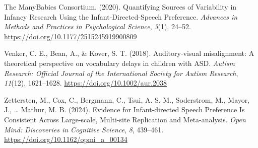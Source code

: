 \documentclass[
  english,
  man,floatsintext]{apa6}
\newlength{\cslhangindent}
\newenvironment{CSLReferences}[2] %
 {\begin{list}{}{%
  \setlength{\itemindent}{0pt}
  \setlength{\leftmargin}{0pt}
  \setlength{\parsep}{0pt}
  \ifodd #1
   \setlength{\leftmargin}{\cslhangindent}
   \setlength{\itemindent}{-1\cslhangindent}
  \fi
  \setlength{\itemsep}{#2\baselineskip}}}
 {\end{list}}
\begin{document}
\begin{CSLReferences}{1}{0}
The ManyBabies Consortium. (2020). Quantifying {Sources} of {Variability} in {Infancy Research Using} the {Infant-Directed-Speech Preference}. \emph{Advances in Methods and Practices in Psychological Science}, \emph{3}(1), 24--52. \url{https://doi.org/10.1177/2515245919900809}

Venker, C. E., Bean, A., \& Kover, S. T. (2018). Auditory-visual misalignment: {A} theoretical perspective on vocabulary delays in children with {ASD}. \emph{Autism Research: Official Journal of the International Society for Autism Research}, \emph{11}(12), 1621--1628. \url{https://doi.org/10.1002/aur.2038}

Zettersten, M., Cox, C., Bergmann, C., Tsui, A. S. M., Soderstrom, M., Mayor, J., \ldots{} Mathur, M. B. (2024). Evidence for {Infant-directed Speech Preference Is Consistent Across Large-scale}, {Multi-site Replication} and {Meta-analysis}. \emph{Open Mind: Discoveries in Cognitive Science}, \emph{8}, 439--461. \url{https://doi.org/10.1162/opmi_a_00134}

\end{CSLReferences}
\end{document}
